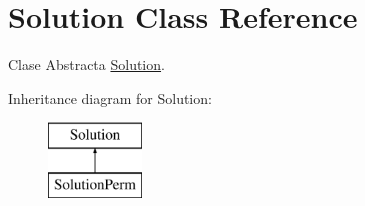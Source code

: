 \hypertarget{class_solution}{\section{Solution Class Reference}
\label{class_solution}
}


Clase Abstracta \hyperlink{class_solution}{Solution}.  


Inheritance diagram for Solution\+:\begin{figure}[H]
\begin{center}
\leavevmode
\includegraphics[height=2.000000cm]{class_solution}
\end{center}
\end{figure}
